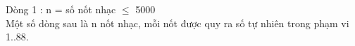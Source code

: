 Dòng 1 : n = số nốt nhạc  $\le$  5000   
\\   Một số dòng sau là n nốt nhạc, mỗi nốt được quy ra số tự nhiên trong phạm vi 1..88.   
\\